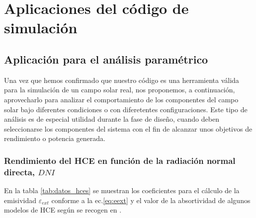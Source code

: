 \chapter{Aplicaciones del código de simulación}
\label{aplicaciones}

\section{Aplicación para el análisis paramétrico}
\label{analisis-parametrico}

Una vez que hemos confirmado que nuestro código es una herramienta válida para la simulación de un campo solar real, nos proponemos, a continuación, aprovecharlo para analizar el comportamiento de los componentes del campo solar bajo diferentes condiciones o con diferetentes configuraciones. Este tipo de análisis es de especial utilidad durante la fase de diseño, cuando deben seleccionarse los componentes del sistema con el fin de alcanzar unos objetivos de rendimiento o potencia generada.

\subsection{Rendimiento del HCE en función de la radiación normal directa, $DNI$}

En la tabla \ref{tab:datos_hces} se muestran los coeficientes para el cálculo de la emisividad $\varepsilon_{ext}$ conforme a la ec.\eqref{eq:eext} y el valor de la absortividad de algunos modelos de HCE según se recogen en \cite{barberofresnoDesarrolloModeloTeorico2018}.

\begin{table}[h!]
\centering
\caption{Constantes del modelo de emisividad equivalente para cada uno de los receptores seleccionados. *Al no disponerse de este dato, se ha empleado este valor con el fin de poder incluir el modelo en el test. Fuente \cite{barberofresnoDesarrolloModeloTeorico2018}}
\label{tab:datos_hces}
\end{table}

